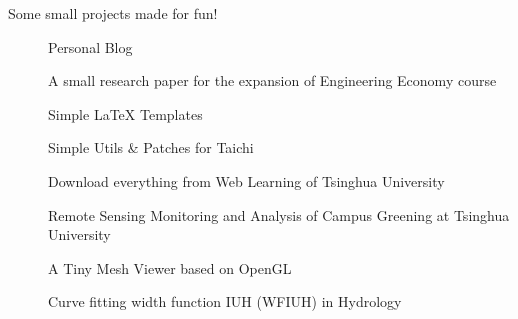 

Some small projects made for fun!

\begin{description}
  \item[] Personal Blog
  \item[] A small research paper for the expansion of Engineering Economy course
  \item[] Simple \LaTeX{} Templates
  \item[] Simple Utils \& Patches for Taichi
  \item[] Download everything from Web Learning of Tsinghua University
  \item[] Remote Sensing Monitoring and Analysis of Campus Greening at Tsinghua University
  \item[] A Tiny Mesh Viewer based on OpenGL
  \item[] Curve fitting width function IUH (WFIUH) in Hydrology
\end{description}
